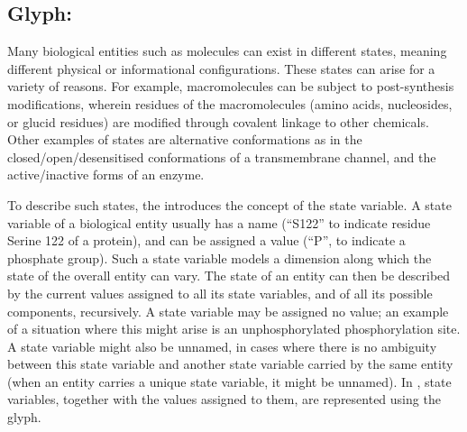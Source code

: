 
\subsection{Glyph: }
\label{sec:stateVariable}

Many biological entities such as molecules can exist in different states, meaning different physical or informational configurations.
These states can arise for a variety of reasons.
For example, macromolecules can be subject to post-synthesis modifications, wherein residues of the macromolecules (amino acids, nucleosides, or glucid residues) are modified through covalent linkage to other chemicals.
Other examples of states are alternative conformations as in the closed/open/desensitised conformations of a transmembrane channel, and the active/inactive forms of an enzyme.


To describe such states, the \PD introduces the concept of the state variable.
A state variable of a biological entity usually has a name (\eg ``S122'' to indicate residue Serine 122 of a protein), and can be assigned a value (\eg ``P'', to indicate a phosphate group).
Such a state variable models a dimension along which the state of the overall entity can vary.
The state of an entity can then be described by the current values assigned to all its state variables, and of all its possible components, recursively.
A state variable may be assigned no value; an example of a situation where this might arise is an unphosphorylated phosphorylation site.
% 
A state variable might also be unnamed, in cases where there is no ambiguity between this state variable and another state variable carried by the same entity (\eg when an entity carries a unique state variable, it might be unnamed).
% 
In \PD, state variables, together with the values assigned to them, are represented using the  glyph.


